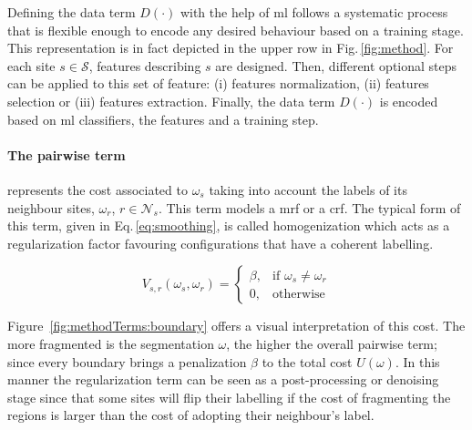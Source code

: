 {\color{red} Defining the data term $D(\cdot)$ with the help of \ac{ml} follows a systematic process that is flexible enough to encode any desired behaviour based on a training stage.  This representation is in fact depicted in the upper row in Fig.\,\ref{fig:method}.  For each site $s \in \mathcal{S}$, features describing $s$ are designed. Then, different optional steps can be applied to this set of feature: (i) features normalization, (ii) features selection or (iii) features extraction. Finally, the data term $D(\cdot)$ is encoded based on \ac{ml} classifiers, the features and a training step. }

\paragraph{The pairwise term} \label{sec:method:mrfTerm}
represents the cost associated to $\omega_s$ taking into account the labels of its neighbour sites, $\omega_r$, $r \in \mathcal{N}_{s}$. 
This term models a \ac{mrf} or a \ac{crf}.
The typical form of this term, given in Eq.\,\eqref{eq:smoothing}, is called homogenization which acts as a regularization factor favouring configurations that have a coherent labelling.

\begin{equation}
V_{s,r}(\omega_s,\omega_r) = 
\begin{cases}
    \beta, & \text{if } \omega_s \ne \omega_r\\
    0,              & \text{otherwise}
\end{cases}
\label{eq:smoothing}
\end{equation}

Figure~\ref{fig:methodTerms:boundary} offers a visual interpretation of this cost.
The more fragmented is the segmentation $\omega$, the higher the overall pairwise term; since every boundary brings a penalization $\beta$ to the total cost $U(\omega)$.
In this manner the regularization term can be seen as a post-processing or denoising stage since that some sites will flip their labelling if the cost of fragmenting the regions is larger than the cost of adopting their neighbour's label.


